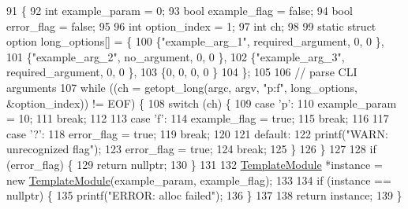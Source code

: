 \begin{DoxyCode}
91 \{
92     \textcolor{keywordtype}{int} example\_param = 0;
93     \textcolor{keywordtype}{bool} example\_flag = \textcolor{keyword}{false};
94     \textcolor{keywordtype}{bool} error\_flag = \textcolor{keyword}{false};
95 
96     \textcolor{keywordtype}{int} option\_index = 1;
97     \textcolor{keywordtype}{int} ch;
98 
99     \textcolor{keyword}{static} \textcolor{keyword}{struct }option long\_options[] = \{
100         \{\textcolor{stringliteral}{"example\_arg\_1"},  required\_argument, 0,  0 \},
101         \{\textcolor{stringliteral}{"example\_arg\_2"},  no\_argument,       0,  0 \},
102         \{\textcolor{stringliteral}{"example\_arg\_3"},  required\_argument, 0,  0 \},
103         \{0,         0,                        0,  0 \}
104     \};
105 
106     \textcolor{comment}{// parse CLI arguments}
107     \textcolor{keywordflow}{while} ((ch = getopt\_long(argc, argv, \textcolor{stringliteral}{"p:f"}, long\_options, &option\_index)) != EOF) \{
108         \textcolor{keywordflow}{switch} (ch) \{
109         \textcolor{keywordflow}{case} \textcolor{charliteral}{'p'}:
110             example\_param = 10;
111             \textcolor{keywordflow}{break};
112 
113         \textcolor{keywordflow}{case} \textcolor{charliteral}{'f'}:
114             example\_flag = \textcolor{keyword}{true};
115             \textcolor{keywordflow}{break};
116 
117         \textcolor{keywordflow}{case} \textcolor{charliteral}{'?'}:
118             error\_flag = \textcolor{keyword}{true};
119             \textcolor{keywordflow}{break};
120 
121         \textcolor{keywordflow}{default}:
122             printf(\textcolor{stringliteral}{"WARN: unrecognized flag"});
123             error\_flag = \textcolor{keyword}{true};
124             \textcolor{keywordflow}{break};
125         \}
126     \}
127 
128     \textcolor{keywordflow}{if} (error\_flag) \{
129         \textcolor{keywordflow}{return} \textcolor{keyword}{nullptr};
130     \}
131 
132     \hyperlink{classTemplateModule}{TemplateModule} *instance = \textcolor{keyword}{new} \hyperlink{classTemplateModule}{TemplateModule}(example\_param, example\_flag);
133 
134     \textcolor{keywordflow}{if} (instance == \textcolor{keyword}{nullptr}) \{
135         printf(\textcolor{stringliteral}{"ERROR: alloc failed"});
136     \}
137 
138     \textcolor{keywordflow}{return} instance;
139 \}
\end{DoxyCode}
\mbox{\label{classTemplateModule_a0a5e50f74b8a4bc4d3102eb1487efc88}} 
